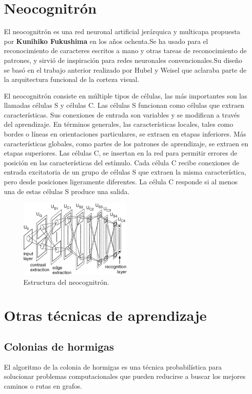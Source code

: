 \documentclass[a4paper, 11pt]{article} %
\begin{document}
\section{Neocognitrón}
El neocognitrón es una red neuronal artificial jerárquica y multicapa propuesta por \textbf{Kunihiko Fukushima} en los años ochenta.Se ha usado para el reconocimiento de caracteres escritos a mano y otras tareas de reconocimiento de patrones, y sirvió de inspiración para redes neuronales convencionales.Su diseño se basó en el trabajo anterior realizado por Hubel y Weisel que aclaraba parte de la arquitectura funcional de la corteza visual.

El neocognitrón consiste en múltiple tipos de células, las más importantes son las llamadas células S y células C. Las células S funcionan como células que extraen características. Sus conexiones de entrada son variables y se modifican a través del aprendizaje. En términos generales, las características locales, tales como bordes o líneas en orientaciones particulares, se extraen en etapas inferiores. Más características globales, como partes de los patrones de aprendizaje, se extraen en etapas superiores.
Las células C, se insertan en la red para permitir errores de posición en las características del estímulo. Cada célula C recibe conexiones de entrada excitatoria de un grupo de células S que extraen la misma característica, pero desde posiciones ligeramente diferentes. La célula C responde si al menos una de estas células S produce una salida.

\begin{figure}[H]
	\centering
	\includegraphics[width=0.5\textwidth]{neocognitron1.png}
	\caption{Estructura del neocognitrón.}
	\label{Estructura del neocognitron.}
\end{figure}

\section{Otras técnicas de aprendizaje}

\subsection{Colonias de hormigas}
El algoritmo de la colonia de hormigas es una técnica probabilística para solucionar problemas computacionales que pueden reducirse a buscar los mejores caminos o rutas en grafos.
\end{document}
